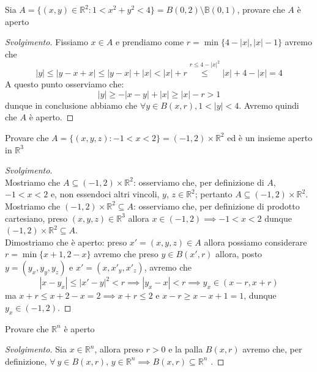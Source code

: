 %
\vspace{0.5cm}
\begin{exercise}
Sia $A=\{(x, y) \in \mathbb{R}^2 : 1 < x^2 + y^2 < 4 \} = B(0, 2) \setminus \mathbb{B}(0,1)$, provare che $A$ è aperto
\end{exercise}
%
\begin{proof}[Svolgimento]
	Fissiamo $x \in A$ e prendiamo come $r=\min{ \{ 4-|x|, |x|-1 \} }$ avremo che
	\[
	|y| \leq |y-x+x| \leq |y-x| + |x| < |x| + r \stackrel{r \leq 4 - |x|^2}{\leq} |x| + 4 - |x| = 4
	\]
	A questo punto osserviamo che:
	\[
	|y| \geq -|x-y| + |x| \geq |x| - r > 1
	\]
	dunque in conclusione abbiamo che $\forall y \in B(x, r), 1 < |y| < 4$. Avremo quindi che $A$ è aperto.
\end{proof}
\vspace{0.5cm}
\begin{exercise}
Provare che $A = \{(x, y, z) : -1 < x < 2 \} = (-1, 2) \times \mathbb{R}^2$ ed è un insieme aperto in $\mathbb{R}^3$
\end{exercise}
%
\begin{proof}[Svolgimento] \hspace{1cm} \\
	Mostriamo che $A \subseteq (-1, 2) \times \mathbb{R}^2$: osserviamo che, per definizione di $A$, $-1<x<2$ e, non essendoci altri vincoli, $y$, $z \in \mathbb{R}^2$; pertanto $A \subseteq (-1, 2) \times \mathbb{R}^2$. \\
	Mostriamo che $(-1, 2) \times \mathbb{R}^2 \subseteq A$: osserviamo che, per definizione di prodotto cartesiano, preso $(x, y, z) \in \mathbb{R}^3$ allora $x \in (-1, 2) \implies -1 < x < 2$ dunque $(-1, 2) \times \mathbb{R}^2 \subseteq A$. \\
	Dimostriamo che è aperto: preso $x'=(x, y, z) \in A$ allora possiamo considerare $r = \min{ \{x+1, 2-x \} }$ avremo che preso $y \in B(x', r)$ allora, posto $y=(y_x, y_y, y_z)$ e $x'=(x, x'_y, x'_z)$, avremo che
	\[
	|x - y_x| \leq |x'-y|^2 < r \implies |y_x - x| < r \implies y_x \in (x - r, x + r) 
	\]
	ma $x + r \leq x + 2 - x = 2 \implies x + r \leq 2$ e $x - r \geq x - x + 1 = 1$, dunque $y_x \in (-1, 2)$.
\end{proof}
%
\vspace{0.5cm}
\begin{exercise}
	Provare che $\mathbb{R}^n$ è aperto
\end{exercise}
%
\begin{proof}[Svolgimento]
	Sia $x \in \mathbb{R}^n$, allora preso $r > 0$ e la palla $B(x, r)$ avremo che, per definizione, $\forall\ y \in B(x, r),\, y \in \mathbb{R}^n \implies B(x, r) \subseteq \mathbb{R}^n$ .
\end{proof}
%
%
%
%
%
\vspace{0.5cm}
